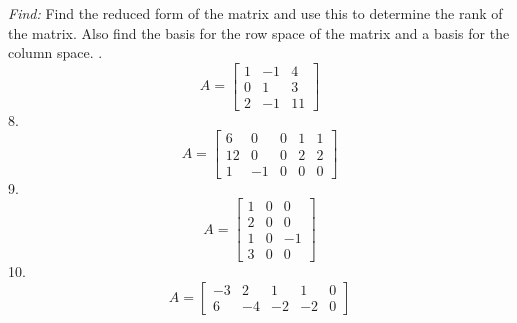 \documentclass[11pt]{homework}
\begin{document}
\emph{Find:}
\newline
Find the reduced form of the matrix 
and use this to determine the rank of the matrix. 
Also find the basis for the row space of the matrix
and a basis for the column space.
.
\begin{equation*}
A = 
  \begin{bmatrix}
  1 & -1 & 4 \\
  0 & 1 & 3 \\
  2 & -1 & 11 
  \end{bmatrix}
\end{equation*}
8.
\begin{equation*}
A = 
  \begin{bmatrix}
  6 & 0 & 0 & 1 & 1 \\
  12 & 0 & 0 & 2 & 2 \\
  1 & -1 & 0 & 0 & 0 
  \end{bmatrix}
\end{equation*}
9.
\begin{equation*}
A = 
  \begin{bmatrix}
  1 & 0 & 0 \\
  2 & 0 & 0 \\
  1 & 0 & -1 \\
  3 & 0 & 0 
  \end{bmatrix}
\end{equation*}
10.
\begin{equation*}
A = 
  \begin{bmatrix}
  -3 & 2 & 1 & 1 & 0 \\
  6 & -4 & -2 & -2 & 0
  \end{bmatrix}
\end{equation*}
\end{document}
